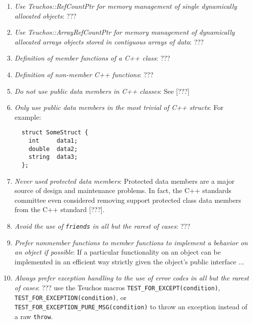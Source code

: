 \begin{enumerate}

{}\item\textit{Use Teuchos::RefCountPtr for memory management of single
dynamically allocated objects}: ???

{}\item\textit{Use Teuchos::ArrayRefCountPtr for memory management of
dynamically allocated arrays objects stored in contiguous arrays of data}: ???

{}\item\textit{Definition of member functions of a C++ class}: ???

{}\item\textit{Definition of non-member C++ functions}: ???

{}\item\textit{Do not use public data members in C++ classes}: See [???]

{}\item\textit{Only use public data members in the most trivial of C++
structs}: For example:

{\small\begin{verbatim}
  struct SomeStruct {
    int     data1;
    double  data2;
    string  data3;
  };
\end{verbatim}}

{}\item\textit{Never used protected data members}: Protected data members are
a major source of design and maintenance problems.  In fact, the C++
standards committee even considered removing support protected class data
members from the C++ standard [???].

{}\item\textit{Avoid the use of {}\texttt{friends} in all but the rarest of
cases}: ???

{}\item\textit{Prefer nonmember functions to member functions to implement a
behavior on an object if possible}: If a particular functionality on an object
can be implemented in an efficient way strictly given the object's public interface ...

{}\item\textit{Always prefer exception handling to the use of error codes in
all but the rarest of cases}: ??? use the Teuchos macros
{}\texttt{TEST\-\_FOR\-\_EXCEPT(condition)},
{}\texttt{TEST\-\_FOR\-\_EXCEPTION(condition)}, or
{}\texttt{TEST\-\_FOR\-\_EXCEPTION\-\_PURE\-\_MSG(condition)} to throw an
exception instead of a raw {}\texttt{throw}.


\end{enumerate}
